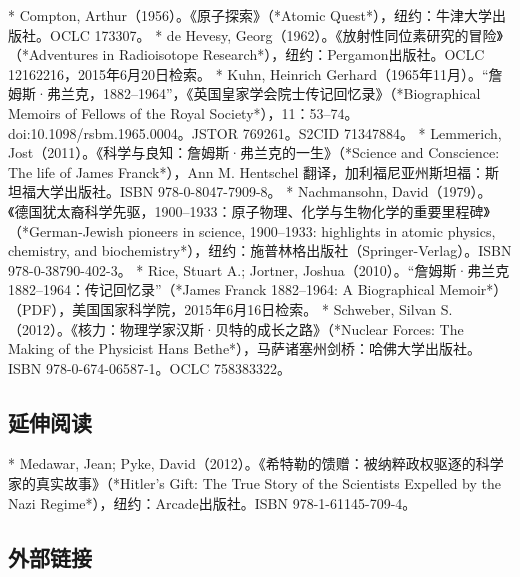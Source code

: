 * Compton, Arthur（1956）。《原子探索》（*Atomic Quest*），纽约：牛津大学出版社。OCLC 173307。
* de Hevesy, Georg（1962）。《放射性同位素研究的冒险》（*Adventures in Radioisotope Research*），纽约：Pergamon出版社。OCLC 12162216，2015年6月20日检索。
* Kuhn, Heinrich Gerhard（1965年11月）。“詹姆斯·弗兰克，1882–1964”，《英国皇家学会院士传记回忆录》（*Biographical Memoirs of Fellows of the Royal Society*），11：53–74。doi:10.1098/rsbm.1965.0004。JSTOR 769261。S2CID 71347884。
* Lemmerich, Jost（2011）。《科学与良知：詹姆斯·弗兰克的一生》（*Science and Conscience: The life of James Franck*），Ann M. Hentschel 翻译，加利福尼亚州斯坦福：斯坦福大学出版社。ISBN 978-0-8047-7909-8。
* Nachmansohn, David（1979）。《德国犹太裔科学先驱，1900–1933：原子物理、化学与生物化学的重要里程碑》（*German-Jewish pioneers in science, 1900–1933: highlights in atomic physics, chemistry, and biochemistry*），纽约：施普林格出版社（Springer-Verlag）。ISBN 978-0-38790-402-3。
* Rice, Stuart A.; Jortner, Joshua（2010）。“詹姆斯·弗兰克 1882–1964：传记回忆录”（*James Franck 1882–1964: A Biographical Memoir*）（PDF），美国国家科学院，2015年6月16日检索。
* Schweber, Silvan S.（2012）。《核力：物理学家汉斯·贝特的成长之路》（*Nuclear Forces: The Making of the Physicist Hans Bethe*），马萨诸塞州剑桥：哈佛大学出版社。ISBN 978-0-674-06587-1。OCLC 758383322。

\subsection{延伸阅读}

* Medawar, Jean; Pyke, David（2012）。《希特勒的馈赠：被纳粹政权驱逐的科学家的真实故事》（*Hitler's Gift: The True Story of the Scientists Expelled by the Nazi Regime*），纽约：Arcade出版社。ISBN 978-1-61145-709-4。

\subsection{外部链接}

